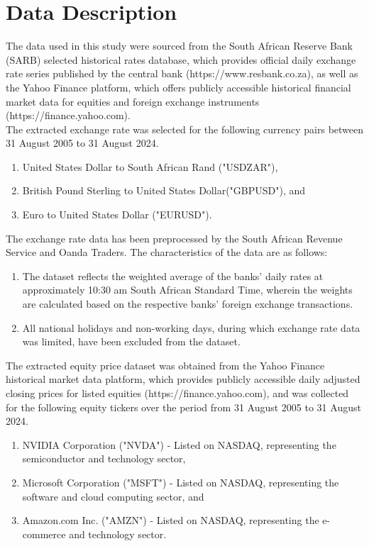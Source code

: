 \documentclass[oneside,12pt]{CUEDthesisPSnPDF}
\begin{document}

\section{Data Description}
\noindent 
The data used in this study were sourced from the South African Reserve Bank (SARB) selected historical rates database, which provides official daily exchange rate series published by the central bank (https://www.resbank.co.za), as well as the Yahoo Finance platform, which offers publicly accessible historical financial market data for equities and foreign exchange instruments (https://finance.yahoo.com).\\

The extracted exchange rate was selected for the following currency pairs between 31 August 2005 to 31 August 2024.
\begin{enumerate}
    \item United States Dollar to South African Rand ("USDZAR"),
    \item British Pound Sterling to United States Dollar("GBPUSD"), and
    \item Euro to United States Dollar ("EURUSD").
\end{enumerate}

The exchange rate data has been preprocessed by the South African Revenue Service and Oanda Traders. The characteristics of the data are as follows:
\begin{enumerate}
    \item The dataset reflects the weighted average of the banks' daily rates at approximately 10:30 am South African Standard Time, wherein the weights are calculated based on the respective banks' foreign exchange transactions.
    \item All national holidays and non-working days, during which exchange rate data was limited, have been excluded from the dataset.
\end{enumerate}

The extracted equity price dataset was obtained from the Yahoo Finance historical market data platform, which provides publicly accessible daily adjusted closing prices for listed equities (https://finance.yahoo.com), and was collected for the following equity tickers over the period from 31 August 2005 to 31 August 2024.
\begin{enumerate}
    \item NVIDIA Corporation ("NVDA") - Listed on NASDAQ, representing the semiconductor and technology sector,
    \item Microsoft Corporation ("MSFT") - Listed on NASDAQ, representing the software and cloud computing sector, and
    \item Amazon.com Inc. ("AMZN") - Listed on NASDAQ, representing the e-commerce and technology sector.
\end{enumerate}
\end{document}
